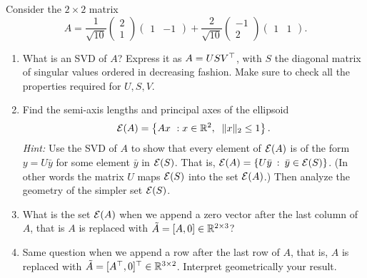 
Consider the $2 \times 2$ matrix
\[
A = \frac{1}{\sqrt{10}} \left( \begin{array}{c} 2 \\ 1 \end{array}\right)
\left( \begin{array}{cc} 1 & -1 \end{array}\right)
+ \frac{2}{\sqrt{10}}
\left( \begin{array}{c} -1 \\ 2 \end{array}\right)
\left( \begin{array}{cc} 1 & 1 \end{array}\right).
\]
\begin{enumerate}
\item What is an SVD of $A$? Express it as $A = U S V^{\top}$, with $S$ the diagonal matrix of singular values ordered in decreasing fashion. Make sure to check all the properties required for $U,S,V$.

\sol{

}
\item Find the semi-axis lengths and principal axes of the ellipsoid 
\[
{\cal E}(A) = \left\{ Ax ~: x \in \mathbb{R}^{2} , \;\; \|x\|_2 \le 1 \right\}.
\]
{\em Hint:} Use the SVD of $A$ to show that every element of ${\cal E}(A)$ is of the form $y = U\bar{y}$ for some element $\bar{y}$ in ${\cal E}(S)$. That is, ${\cal E}(A) = \{ U\bar{y} \::\: \bar{y} \in {\cal E}(S) \}$.  (In other words the matrix $U$ maps ${\cal E}(S)$ into the set ${\cal E}(A)$.) Then analyze the geometry of the simpler set ${\cal E}(S)$.

\sol{

}
\item What is the set ${\cal E}(A)$ when we append a zero vector after the last column of $A$, that is $A$ is replaced with $\tilde{A} = [A,0] \in \mathbb{R}^{2 \times 3}$?

\sol{

}
\item Same question when we append a row after the last row of $A$, that is, $A$ is replaced with $\tilde{A} = [A^{\top},0]^{\top} \in \mathbb{R}^{3 \times 2}$. Interpret geometrically your result.

\sol{

}
\end{enumerate}
